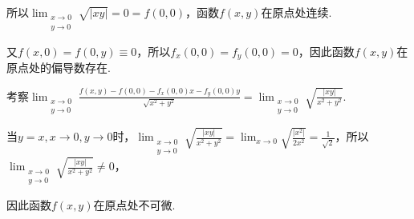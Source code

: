 \documentclass[../Main.tex]{subfiles}
\begin{document}
\begin{enumerate}
          所以$\lim_{\substack{x\to 0 \\ y\to 0}}\sqrt{|xy|}=0=f(0,0)$，函数$f(x,y)$在原点处连续.

          又$f(x,0)=f(0,y)\equiv 0$，所以$f_{x}(0,0)=f_{y}(0,0)=0$，因此函数$f(x,y)$在原点处的偏导数存在.

          考察$\lim_{\substack{x\to 0 \\ y\to 0}}\frac{f(x,y)-f(0,0)-f_{x}(0,0)x-f_{y}(0,0)y}{\sqrt{x^{2}+y^{2}}}
              = \lim_{\substack{x\to 0 \\ y\to 0}}\sqrt{\frac{|xy|}{x^{2}+y^{2}}}$.

          当$y=x,x\to0,y\to0$时，$\lim_{\substack{x\to 0 \\ y\to 0}}\sqrt{\frac{|xy|}{x^{2}+y^{2}}}
              = \lim_{x\to0}\sqrt{\frac{|x^{2}|}{2x^{2}}}= \frac{1}{\sqrt{2}}$，所以$\lim
              _{\substack{x\to 0 \\ y\to 0}}\sqrt{\frac{|xy|}{x^{2}+y^{2}}}\neq 0$，

          因此函数$f(x,y)$在原点处不可微.
\end{enumerate}
\end{document}
